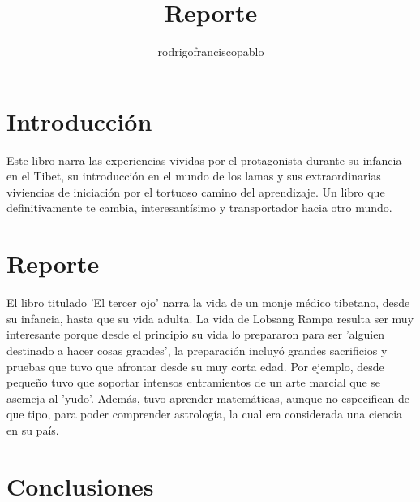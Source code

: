 \documentclass{mylib/reporte}
\title{Reporte}
\author{rodrigofranciscopablo }
\begin{document}
\coverPage

\section{Introducción}

Este libro narra las experiencias vividas por el protagonista durante su infancia en el Tibet, su introducción en el mundo de los lamas y sus extraordinarias viviencias de iniciación por el tortuoso camino del aprendizaje. Un libro que definitivamente te cambia, interesantísimo y transportador hacia otro mundo.


\section{Reporte}

El libro titulado 'El tercer ojo' narra la vida de un monje médico tibetano, desde su infancia, hasta que su vida adulta. La vida de Lobsang Rampa resulta ser muy interesante porque desde el principio su vida lo prepararon para ser 'alguien destinado a hacer cosas grandes', la preparación incluyó grandes sacrificios y pruebas que tuvo que afrontar desde su muy corta edad. Por ejemplo, desde pequeño tuvo que soportar intensos entramientos de un arte marcial que se asemeja al 'yudo'. Además, tuvo aprender matemáticas, aunque no especifican de que tipo, para poder comprender astrología, la cual era considerada una ciencia en su país.

\section{Conclusiones}
\end{document}
